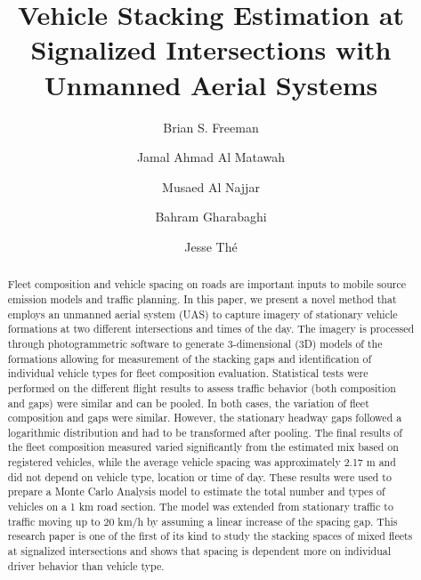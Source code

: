 \documentclass[preprint,12pt,a4paper]{elsarticle}
\title{Vehicle Stacking Estimation at Signalized Intersections with Unmanned Aerial Systems}
\begin{document}
\maketitle

\begin{linenumbers}
\begin{frontmatter}

\author[add1]{Brian S. Freeman }

\author[add2]{Jamal Ahmad Al Matawah}

\author[add3]{Musaed Al Najjar}

\author[add1]{Bahram Gharabaghi}

\author[add1,add4]{Jesse Th\'e }


\address[add1]{School of Engineering, University of Guelph, Guelph, Ontario, N1G 2W1, Canada}
\address[add2]{Civil Engineering Department, College of Technological Studies, Public Authority for Applied Education and Training, Shuwaikh, Kuwait}
\address[add3]{Kuwait Traffic Safety Society, Shuwaikh, Kuwait}
\address[add4]{Lakes Environmental, 170 Columbia St W, Waterloo, Ontario, N2L 3L3 Canada}


\begin{abstract}
Fleet composition and vehicle spacing on roads are important inputs to mobile source emission models and traffic planning. In this paper, we present a novel method that employs an unmanned aerial system (UAS) to capture imagery of stationary vehicle formations at two different intersections and times of the day. The imagery is processed through photogrammetric software to generate 3-dimensional (3D) models of the formations allowing for measurement of the stacking gaps and identification of individual vehicle types for fleet composition evaluation. Statistical tests were performed on the different flight results to assess traffic behavior (both composition and gaps) were similar and can be pooled. In both cases, the variation of fleet composition and gaps were similar. However, the stationary headway gaps followed a logarithmic distribution and had to be transformed after pooling. The final results of the fleet composition measured varied significantly from the estimated mix based on registered vehicles, while the average vehicle spacing was approximately 2.17 m and did not depend on vehicle type, location or time of day. These results were used to prepare a Monte Carlo Analysis model to estimate the total number and types of vehicles on a 1 km road section. The model was extended from stationary traffic to traffic moving up to 20 km/h by assuming a linear increase of the spacing gap. This research paper is one of the first of its kind to study the stacking spaces of mixed fleets at signalized intersections and shows that spacing is dependent more on individual driver behavior than vehicle type.\\


\end{abstract}
\end{frontmatter}
\end{linenumbers}
\end{document}

